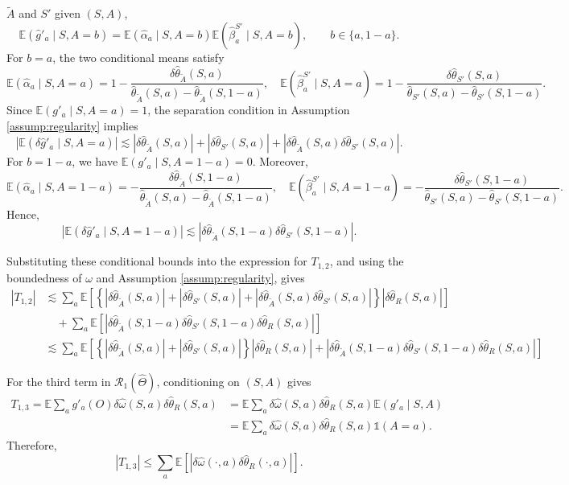 \documentclass[12pt]{article}
\newcommand{\0}{\boldsymbol{0}}
\newcommand{\E}{\mathbb{E}}
\begin{document}
\(\widetilde A\) and \(S'\) given \((S,A)\),\[\E(\widehat g'_a\mid S,A=b)=\E(\widehat\alpha_a\mid S,A=b)\E(\widehat\beta^{S'}_a\mid S,A=b),\qquad b\in\{a,1-a\}.
\]
For \(b=a\), the two conditional means satisfy
\[
\E(\widehat\alpha_a\mid S,A=a)=
1-\frac{\delta \widehat \theta_{\widetilde A}(S,a)}{\widehat\theta_{\widetilde A}(S,a)-\widehat\theta_{\widetilde A}(S,1-a)},\quad 
\E(\widehat\beta^{S'}_a\mid S,A=a) =1-\frac{\delta \widehat \theta_{S'}(S,a)}{\widehat\theta_{S'}(S,a)-\widehat\theta_{S'}(S,1-a)}.
\]
Since \(\E(g'_a\mid S,A=a)=1\), the separation condition in Assumption \ref{assump:regularity} implies
\[
|\E(\delta \widehat g'_a\mid S,A=a)|\lesssim|\delta \widehat \theta_{\widetilde A}(S,a)|+|\delta \widehat \theta_{S'}(S,a)|+|\delta \widehat \theta_{\widetilde A}(S,a)\delta \widehat \theta_{S'}(S,a)|.
\]
For \(b=1-a\), we have \(\E(g'_a\mid S,A=1-a)=0\). Moreover,
\[
\E(\widehat\alpha_a\mid S,A=1-a)=-\frac{\delta \widehat \theta_{\widetilde A}(S,1-a)}
{\widehat\theta_{\widetilde A}(S,a)-\widehat\theta_{\widetilde A}(S,1-a)},\quad
\E(\widehat\beta^{S'}_a\mid S,A=1-a)=-\frac{\delta \widehat \theta_{S'}(S,1-a)}{\widehat\theta_{S'}(S,a)-\widehat\theta_{S'}(S,1-a)}.
\]
Hence,
\[
|\E(\delta \widehat g'_a\mid S,A=1-a)|\lesssim|\delta \widehat \theta_{\widetilde A}(S,1-a)\delta \widehat \theta_{S'}(S,1-a)|.
\]

Substituting these conditional bounds into the expression for \(T_{1,2}\), and using the boundedness of \(\omega\) and Assumption \ref{assump:regularity}, gives
\[
\begin{aligned}
|T_{1,2}|&\lesssim\sum_a\mathbb E\left[\left\{
|\delta\widehat\theta_{\widetilde A}(S,a)|+
|\delta\widehat\theta_{S'}(S,a)|+
|\delta\widehat\theta_{\widetilde A}(S,a)
  \delta\widehat\theta_{S'}(S,a)|\right\}
|\delta\widehat\theta_R(S,a)|\right]  \\
&\quad+\sum_a\mathbb E\left[|\delta\widehat\theta_{\widetilde A}(S,1-a)
  \delta\widehat\theta_{S'}(S,1-a)
  \delta\widehat\theta_R(S,a)|\right] \\
&\lesssim\sum_a\mathbb E  \left[\left\{
|\delta\widehat\theta_{\widetilde A}(S,a)|+
|\delta\widehat\theta_{S'}(S,a)|
\right\}
|\delta\widehat\theta_R(S,a)| +
|\delta\widehat\theta_{\widetilde A}(S,1-a)
  \delta\widehat\theta_{S'}(S,1-a)
  \delta\widehat\theta_R(S,a)|\right]
\end{aligned}
\]


For the third term in \(\mathcal R_1(\widehat\Theta)\), conditioning on \((S,A)\) gives
\[
\begin{aligned}
T_{1,3} = \E\sum_a g'_a(O)\delta \widehat \omega(S,a)\delta \widehat \theta_R(S,a)
&=\E\sum_a\delta \widehat \omega(S,a)\delta \widehat \theta_R(S,a)\E(g'_a\mid S,A)  \\
&=\E\sum_a\delta \widehat \omega(S,a)\delta \widehat \theta_R(S,a)\mathds 1(A=a).
\end{aligned}
\]
Therefore,
\[
|T_{1,3}|\le\sum_a \E\left[|\delta \widehat \omega(\cdot,a)\delta \widehat \theta_R(\cdot,a)|\right].
\]
\end{document}
